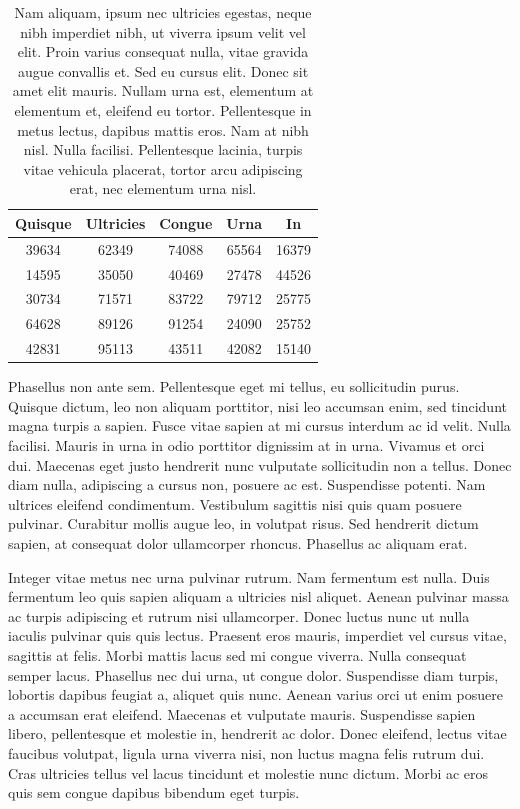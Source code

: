 \begin{table}[!t]
  \centering
  \begin{tabular}{ccccc}
    \toprule
    Quisque & Ultricies & Congue & Urna & In\\
    \midrule
    39634 & 62349 & 74088 & 65564 & 16379\\
    14595 & 35050 & 40469 & 27478 & 44526\\
    30734 & 71571 & 83722 & 79712 & 25775\\
    64628 & 89126 & 91254 & 24090 & 25752\\
    42831 & 95113 & 43511 & 42082 & 15140\\
    \bottomrule
  \end{tabular}
  \caption[Nam aliquam]{
    Nam aliquam, ipsum nec ultricies egestas, neque nibh imperdiet nibh, ut viverra ipsum velit vel elit.
Proin varius consequat nulla, vitae gravida augue convallis et.
Sed eu cursus elit.
Donec sit amet elit mauris.
Nullam urna est, elementum at elementum et, eleifend eu tortor.
Pellentesque in metus lectus, dapibus mattis eros.
Nam at nibh nisl.
Nulla facilisi.
Pellentesque lacinia, turpis vitae vehicula placerat, tortor arcu adipiscing erat, nec elementum urna nisl.
  }
\end{table}

Phasellus non ante sem.
Pellentesque eget mi tellus, eu sollicitudin purus.
Quisque dictum, leo non aliquam porttitor, nisi leo accumsan enim, sed tincidunt magna turpis a sapien.
Fusce vitae sapien at mi cursus interdum ac id velit.
Nulla facilisi.
Mauris in urna in odio porttitor dignissim at in urna.
Vivamus et orci dui.
Maecenas eget justo hendrerit nunc vulputate sollicitudin non a tellus.
Donec diam nulla, adipiscing a cursus non, posuere ac est.
Suspendisse potenti.
Nam ultrices eleifend condimentum.
Vestibulum sagittis nisi quis quam posuere pulvinar.
Curabitur mollis augue leo, in volutpat risus.
Sed hendrerit dictum sapien, at consequat dolor ullamcorper rhoncus.
Phasellus ac aliquam erat.

Integer vitae metus nec urna pulvinar rutrum.
Nam fermentum est nulla.
Duis fermentum leo quis sapien aliquam a ultricies nisl aliquet.
Aenean pulvinar massa ac turpis adipiscing et rutrum nisi ullamcorper.
Donec luctus nunc ut nulla iaculis pulvinar quis quis lectus.
Praesent eros mauris, imperdiet vel cursus vitae, sagittis at felis.
Morbi mattis lacus sed mi congue viverra.
Nulla consequat semper lacus.
Phasellus nec dui urna, ut congue dolor.
Suspendisse diam turpis, lobortis dapibus feugiat a, aliquet quis nunc.
Aenean varius orci ut enim posuere a accumsan erat eleifend.
Maecenas et vulputate mauris.
Suspendisse sapien libero, pellentesque et molestie in, hendrerit ac dolor.
Donec eleifend, lectus vitae faucibus volutpat, ligula urna viverra nisi, non luctus magna felis rutrum dui.
Cras ultricies tellus vel lacus tincidunt et molestie nunc dictum.
Morbi ac eros quis sem congue dapibus bibendum eget turpis.

